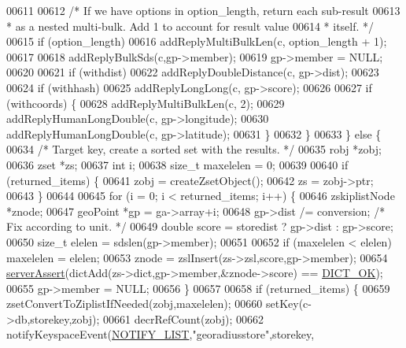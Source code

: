 \begin{DoxyCode}
{{{{{{{{{00611 
00612             \textcolor{comment}{/* If we have options in option\_length, return each sub-result}
00613 \textcolor{comment}{             * as a nested multi-bulk.  Add 1 to account for result value}
00614 \textcolor{comment}{             * itself. */}
00615             \textcolor{keywordflow}{if} (option\_length)
00616                 addReplyMultiBulkLen(c, option\_length + 1);
00617 
00618             addReplyBulkSds(c,gp->member);
00619             gp->member = NULL;
00620 
00621             \textcolor{keywordflow}{if} (withdist)
00622                 addReplyDoubleDistance(c, gp->dist);
00623 
00624             \textcolor{keywordflow}{if} (withhash)
00625                 addReplyLongLong(c, gp->score);
00626 
00627             \textcolor{keywordflow}{if} (withcoords) \{
00628                 addReplyMultiBulkLen(c, 2);
00629                 addReplyHumanLongDouble(c, gp->longitude);
00630                 addReplyHumanLongDouble(c, gp->latitude);
00631             \}
00632         \}
00633     \} \textcolor{keywordflow}{else} \{
00634         \textcolor{comment}{/* Target key, create a sorted set with the results. */}
00635         robj *zobj;
00636         zset *zs;
00637         \textcolor{keywordtype}{int} i;
00638         size\_t maxelelen = 0;
00639 
00640         \textcolor{keywordflow}{if} (returned\_items) \{
00641             zobj = createZsetObject();
00642             zs = zobj->ptr;
00643         \}
00644 
00645         \textcolor{keywordflow}{for} (i = 0; i < returned\_items; i++) \{
00646             zskiplistNode *znode;
00647             geoPoint *gp = ga->array+i;
00648             gp->dist /= conversion; \textcolor{comment}{/* Fix according to unit. */}
00649             \textcolor{keywordtype}{double} score = storedist ? gp->dist : gp->score;
00650             size\_t elelen = sdslen(gp->member);
00651 
00652             \textcolor{keywordflow}{if} (maxelelen < elelen) maxelelen = elelen;
00653             znode = zslInsert(zs->zsl,score,gp->member);
00654             \hyperlink{server_8h_a88114b5169b4c382df6b56506285e56a}{serverAssert}(dictAdd(zs->dict,gp->member,&znode->score) == 
      \hyperlink{dict_8h_a2afecbeab8f7efbc183048f52f6d17e5}{DICT\_OK});
00655             gp->member = NULL;
00656         \}
00657 
00658         \textcolor{keywordflow}{if} (returned\_items) \{
00659             zsetConvertToZiplistIfNeeded(zobj,maxelelen);
00660             setKey(c->db,storekey,zobj);
00661             decrRefCount(zobj);
00662             notifyKeyspaceEvent(\hyperlink{server_8h_a1c0b64c84b0e66dff3554ffe3e2ec4c8}{NOTIFY\_LIST},\textcolor{stringliteral}{"georadiusstore"},storekey,
}}}}}}}}}
\end{DoxyCode}
